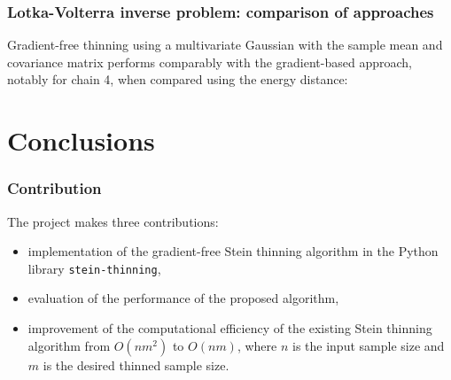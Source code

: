 \documentclass{beamer}
\begin{document}
\begin{frame}
\frametitle{Lotka-Volterra inverse problem: comparison of approaches}

Gradient-free thinning using a multivariate Gaussian with the sample mean and covariance matrix performs comparably with the gradient-based approach, notably for chain 4, when compared using the energy distance:

\begin{figure}[h]
\centering
{}
\end{figure}

\end{frame}



\section{Conclusions}

\begin{frame}
\frametitle{Contribution}

The project makes three contributions:
\begin{itemize}
\item implementation of the gradient-free Stein thinning algorithm in the Python library \texttt{stein-thinning},
\item evaluation of the performance of the proposed algorithm,
\item improvement of the computational efficiency of the existing Stein thinning algorithm from $O(nm^2)$ to $O(nm)$, where $n$ is the input sample size and $m$ is the desired thinned sample size.
\end{itemize}

\end{frame}
\end{document}
